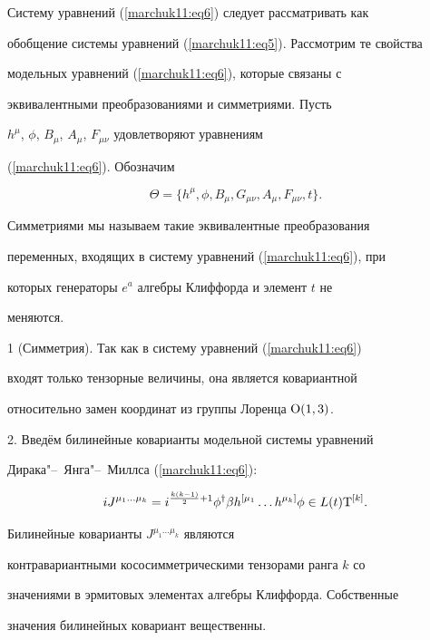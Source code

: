 Систему уравнений  (\ref{marchuk11:eq6}) следует рассматривать как

обобщение системы уравнений (\ref{marchuk11:eq5}). Рассмотрим те свойства

модельных уравнений (\ref{marchuk11:eq6}),  которые связаны с

эквивалентными преобразованиями и симметриями. Пусть

$h^\mu$,  $\phi$,  $B_\mu$,  $A_\mu$,  $F_{\mu\nu}$ удовлетворяют уравнениям

(\ref{marchuk11:eq6}). Обозначим

$$

\Theta=\{h^\mu, \phi, B_\mu, G_{\mu\nu}, A_\mu, F_{\mu\nu}, t\}.

$$

Симметриями мы называем такие эквивалентные преобразования

переменных,  входящих в систему уравнений (\ref{marchuk11:eq6}),  при

которых генераторы $e^a$ алгебры Клиффорда и элемент $t$ не

меняются.



\smallskip



1 (Симметрия). Так как в систему уравнений (\ref{marchuk11:eq6})

входят только тензорные величины,   она является ковариантной

относительно замен координат из группы Лоренца ${\rm O}(1, 3)$.



\smallskip



2. Введём билинейные коварианты модельной системы уравнений

Дирака"--~Янга"--~Миллса (\ref{marchuk11:eq6}):

$$

i J^{\mu_1\ldots\mu_k}= i^{\frac{k(k-1)}{2}+1}\phi^\dagger \beta

h^{[\mu_1}\ldots h^{\mu_k]}\phi \in L(t){\rm T}^{[k]}.

$$



Билинейные коварианты $J^{\mu_1\ldots\mu_k}$ являются

контравариантными кососимметрическими тензорами ранга $k$ со

значениями в эрмитовых элементах алгебры Клиффорда. Собственные

значения билинейных ковариант вещественны.



